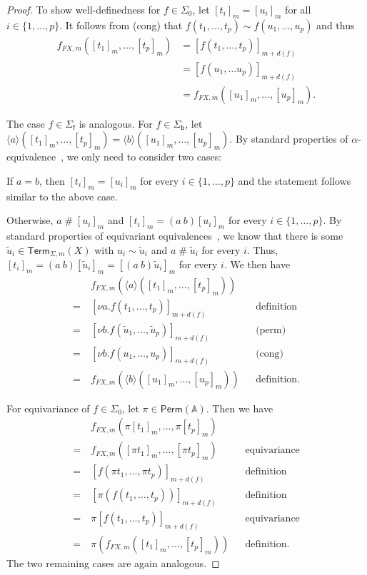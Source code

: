 \documentclass[a4paper,UKenglish,cleveref,thm-restate,numberwithinsect,final]{lipics-v2021}
\newcommand{\Perm}{\mathsf{Perm}(\Names)}
\newcommand{\Term}{\mathsf{Term}}
\newcommand{\sig}{\Sigma}
\newcommand{\sigp}{\Sigma_0}
\newcommand{\sigf}{\Sigma_{\mathsf f}}
\newcommand{\sigb}{\Sigma_{\mathsf b}}
\newcommand{\Names}{\mathbb{A}}
\newcommand{\fresh}{\mathbin{\#}}
\theoremstyle{plain}
\numberwithin{equation}{section}
\newcommand{\+}[1]{\mathcal{#1}\xspace}
\theoremstyle{definition}
\begin{document}
\begin{proof}
    To show well-definedness for \(f \in \sigp\), let \([t_i]_m = [u_i]_m\) for all \(i \in \{1, \ldots, p\}\).
    It follows from (cong) that \(f(t_1, \ldots, t_p) \sim f(u_1, \ldots, u_p)\) and thus
    \begin{align*}
        f_{FX, m}([t_1]_m, \ldots, [t_p]_m)
        &= [f(t_1, \ldots, t_p)]_{m + d(f)} \\
        &= [f(u_1, \ldots u_p)]_{m + d(f)} \\
        &= f_{FX, m}([u_1]_m, \ldots, [u_p]_m).
    \end{align*}

    The case \(f \in \sigf\) is analogous. For \(f \in \sigb\), let
    \(\langle a \rangle ([t_1]_m, \ldots, [t_p]_m) = \langle b
    \rangle ([u_1]_m, \ldots, [u_p]_m)\).  By standard
    properties of $\alpha$-equivalence~\cite{Pitts13}, we only
    need to consider two cases:

    If \(a = b\), then \([t_i]_m = [u_i]_m\) for every \(i \in \{1, \ldots, p\}\) and the statement follows similar to the above case.

    Otherwise, \(a \fresh [u_i]_m\) and \([t_i]_m = (a\ b)[u_i]_m\) for every \(i \in \{1, \ldots, p\}\).
    By standard properties of equivariant equivalences~\cite{Pitts13}, we know that there is some \(\tilde{u}_i \in \Term_{\sig, m}(X)\) with \(u_i \sim \tilde{u}_i\) and \(a \fresh \tilde{u}_i\) for every \(i\).
    Thus, \([t_i]_m = (a\ b)[\tilde{u}_i]_m = [(a\ b)\tilde{u}_i]_m\) for every \(i\).
    We then have
    \begin{align*}
        &f_{FX, m}(\langle a \rangle ([t_1]_m, \ldots, [t_p]_m)) \\
        =~&[\nu a.f(t_1, \ldots, t_p)]_{m + d(f)} && \text{definition} \\
        =~&[\nu b.f(\tilde{u}_1, \ldots, \tilde{u}_p)]_{m + d(f)} && \text{(perm)} \\
        =~&[\nu b.f(u_1, \ldots, u_p)]_{m + d(f)} && \text{(cong)} \\
        =~&f_{FX, m}(\langle b \rangle ([u_1]_m, \ldots, [u_p]_m)) && \text{definition}.
    \end{align*}

    For equivariance of \(f \in \sigp\), let \(\pi \in \Perm\).
    Then we have
    \begin{align*}
        &f_{FX, m}(\pi[t_1]_m, \ldots, \pi[t_p]_m) \\
        =~&f_{FX, m}([\pi t_1]_m, \ldots, [\pi t_p]_m) && \text{equivariance} \\
        =~&[f(\pi t_1, \ldots, \pi t_p)]_{m + d(f)} && \text{definition} \\
        =~&[\pi(f(t_1, \ldots, t_p))]_{m + d(f)} && \text{definition} \\
        =~&\pi[f(t_1, \ldots, t_p)]_{m + d(f)} && \text{equivariance} \\
        =~&\pi(f_{FX, m}([t_1]_m, \ldots, [t_p]_m)) && \text{definition}.
    \end{align*}
    The two remaining cases are again analogous.

\end{proof}
\end{document}
